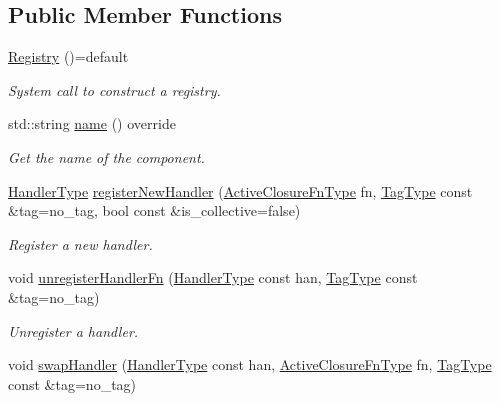 \subsection*{Public Member Functions}
\begin{DoxyCompactItemize}
\item 
\hyperlink{structvt_1_1registry_1_1_registry_a319ac9c59641bee88d48e825a4840aa2}{Registry} ()=default
\begin{DoxyCompactList}\small\item\em System call to construct a registry. \end{DoxyCompactList}\item 
std\+::string \hyperlink{structvt_1_1registry_1_1_registry_a8488eb3ab95e207094617027bb5c75c9}{name} () override
\begin{DoxyCompactList}\small\item\em Get the name of the component. \end{DoxyCompactList}\item 
\hyperlink{namespacevt_af64846b57dfcaf104da3ef6967917573}{Handler\+Type} \hyperlink{structvt_1_1registry_1_1_registry_a2e3b140ef858712eb34deb89623cbbc3}{register\+New\+Handler} (\hyperlink{namespacevt_a2a06c34cafcd511828f16cbf1476b924}{Active\+Closure\+Fn\+Type} fn, \hyperlink{namespacevt_a84ab281dae04a52a4b243d6bf62d0e52}{Tag\+Type} const \&tag=no\+\_\+tag, bool const \&is\+\_\+collective=false)
\begin{DoxyCompactList}\small\item\em Register a new handler. \end{DoxyCompactList}\item 
void \hyperlink{structvt_1_1registry_1_1_registry_aa251ec78d5033c6d05139d598789aa6b}{unregister\+Handler\+Fn} (\hyperlink{namespacevt_af64846b57dfcaf104da3ef6967917573}{Handler\+Type} const han, \hyperlink{namespacevt_a84ab281dae04a52a4b243d6bf62d0e52}{Tag\+Type} const \&tag=no\+\_\+tag)
\begin{DoxyCompactList}\small\item\em Unregister a handler. \end{DoxyCompactList}\item 
void \hyperlink{structvt_1_1registry_1_1_registry_a0533655bd2b805ae7d86be1cd0c792c3}{swap\+Handler} (\hyperlink{namespacevt_af64846b57dfcaf104da3ef6967917573}{Handler\+Type} const han, \hyperlink{namespacevt_a2a06c34cafcd511828f16cbf1476b924}{Active\+Closure\+Fn\+Type} fn, \hyperlink{namespacevt_a84ab281dae04a52a4b243d6bf62d0e52}{Tag\+Type} const \&tag=no\+\_\+tag)

\end{DoxyCompactItemize}
